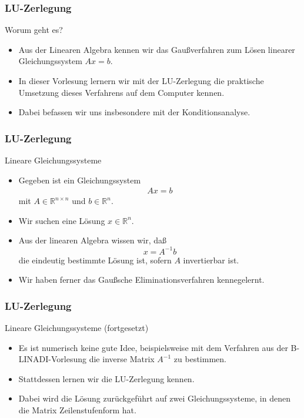\documentclass{beamer}
\title[Annuma]{\mytitle}
\author[Amin Coja-Oghlan]{Amin Coja-Oghlan}
\institute[Frankfurt]{JWGUFFM}
\date{}
\newcommand\RR{\mathbb R}
\renewcommand{\oe}{\"o}
\newcommand{\ue}{\"u}
\newcommand{\mytitle}{LU-Zerlegung}
\begin{document}
\frame[plain]{\titlepage}

\begin{frame}\frametitle{\mytitle}
	\begin{block}{Worum geht es?}
		\begin{itemize}
			\item Aus der Linearen Algebra kennen wir das Gau\ss verfahren zum L\oe sen linearer Gleichungssystem $Ax=b$.
			\item In dieser Vorlesung lernern wir mit der LU-Zerlegung die praktische Umsetzung dieses Verfahrens auf dem Computer kennen.
			\item Dabei befassen wir uns insbesondere mit der Konditionsanalyse.
		\end{itemize}
	\end{block}
\end{frame}

\begin{frame}\frametitle{\mytitle}
	\begin{block}{Lineare Gleichungssysteme}
		\begin{itemize}
			\item Gegeben ist ein Gleichungssystem
				\begin{align*}
				Ax=b
				\end{align*}
				mit $A\in\RR^{n\times n}$ und $b\in\RR^n$.
			\item Wir suchen eine L\oe sung $x\in\RR^n$.
			\item Aus der linearen Algebra wissen wir, da\ss\ $$x=A^{-1}b$$ die eindeutig bestimmte L\oe sung ist, sofern $A$ invertierbar ist.
			\item Wir haben ferner das \alert{Gau\ss sche Eliminationsverfahren} kennegelernt.
		\end{itemize}
	\end{block}
\end{frame}

\begin{frame}\frametitle{\mytitle}
	\begin{block}{Lineare Gleichungssysteme (fortgesetzt)}
		\begin{itemize}
			\item Es ist numerisch keine gute Idee, beispielsweise mit dem Verfahren aus der B-LINADI-Vorlesung die inverse Matrix $A^{-1}$ zu bestimmen.
			\item Stattdessen lernen wir die LU-Zerlegung kennen.
			\item Dabei wird die L\"osung zur\ue ckgef\ue hrt auf zwei Gleichungssysteme, in denen die Matrix \alert{Zeilenstufenform} hat.
		\end{itemize}
	\end{block}
\end{frame}
\end{document}
